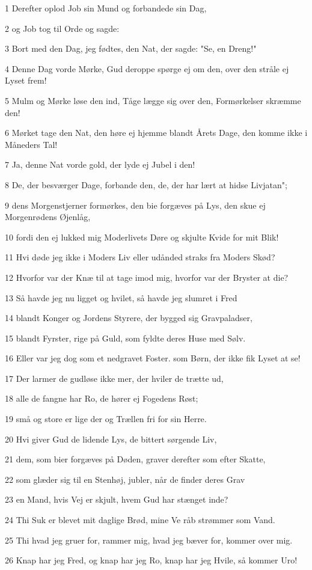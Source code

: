 \par 1 Derefter oplod Job sin Mund og forbandede sin Dag,
\par 2 og Job tog til Orde og sagde:
\par 3 Bort med den Dag, jeg fødtes, den Nat, der sagde: "Se, en Dreng!"
\par 4 Denne Dag vorde Mørke, Gud deroppe spørge ej om den, over den stråle ej Lyset frem!
\par 5 Mulm og Mørke løse den ind, Tåge lægge sig over den, Formørkelser skræmme den!
\par 6 Mørket tage den Nat, den høre ej hjemme blandt Årets Dage, den komme ikke i Måneders Tal!
\par 7 Ja, denne Nat vorde gold, der lyde ej Jubel i den!
\par 8 De, der besværger Dage, forbande den, de, der har lært at hidse Livjatan";
\par 9 dens Morgenstjerner formørkes, den bie forgæves på Lys, den skue ej Morgenrødens Øjenlåg,
\par 10 fordi den ej lukked mig Moderlivets Døre og skjulte Kvide for mit Blik!
\par 11 Hvi døde jeg ikke i Moders Liv eller udånded straks fra Moders Skød?
\par 12 Hvorfor var der Knæ til at tage imod mig, hvorfor var der Bryster at die?
\par 13 Så havde jeg nu ligget og hvilet, så havde jeg slumret i Fred
\par 14 blandt Konger og Jordens Styrere, der bygged sig Gravpaladser,
\par 15 blandt Fyrster, rige på Guld, som fyldte deres Huse med Sølv.
\par 16 Eller var jeg dog som et nedgravet Foster. som Børn, der ikke fik Lyset at se!
\par 17 Der larmer de gudløse ikke mer, der hviler de trætte ud,
\par 18 alle de fangne har Ro, de hører ej Fogedens Røst;
\par 19 små og store er lige der og Trællen fri for sin Herre.
\par 20 Hvi giver Gud de lidende Lys, de bittert sørgende Liv,
\par 21 dem, som bier forgæves på Døden, graver derefter som efter Skatte,
\par 22 som glæder sig til en Stenhøj, jubler, når de finder deres Grav
\par 23 en Mand, hvis Vej er skjult, hvem Gud har stænget inde?
\par 24 Thi Suk er blevet mit daglige Brød, mine Ve råb strømmer som Vand.
\par 25 Thi hvad jeg gruer for, rammer mig, hvad jeg bæver for, kommer over mig.
\par 26 Knap har jeg Fred, og knap har jeg Ro, knap har jeg Hvile, så kommer Uro!

